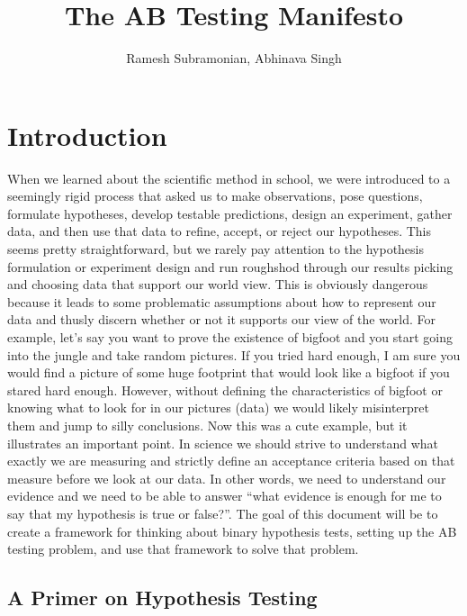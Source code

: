 \documentclass[12pt]{report}
\begin{document}
\title{The AB Testing Manifesto}
\author{Ramesh Subramonian, Abhinava Singh}

\maketitle

\section{Introduction\label{sec:Intro}}

When we learned about the scientific method in school, we were introduced to a seemingly rigid process that 
asked us to make observations, pose questions, formulate hypotheses, develop testable predictions, design an 
experiment, gather data, and then use that data to refine, accept, or reject our hypotheses. This seems pretty 
straightforward, but we rarely pay attention to the hypothesis formulation or experiment design and run 
roughshod through our results picking and choosing data that support our world view. This is obviously 
dangerous because it leads to some problematic assumptions about how to represent our data and thusly discern 
whether or not it supports our view of the world. For example, let’s say you want to prove the existence of 
bigfoot and you start going into the jungle and take random pictures. If you tried hard enough, I am sure you 
would find a picture of some huge footprint that would look like a bigfoot if you stared hard enough. However, 
without defining the characteristics of bigfoot or knowing what to look for in our pictures (data) we would 
likely misinterpret them and jump to silly conclusions. Now this was a cute example, but it illustrates an 
important point. In science we should strive to understand what exactly we are measuring and strictly 
define an acceptance criteria based on that measure before we look at our data. In other words, we need 
to understand our evidence and we need to be able to answer “what evidence is enough for me to say that my 
hypothesis is true or false?”. The goal of this document will be to create a framework for thinking about 
binary hypothesis tests, setting up the AB testing problem, and use that framework to solve that problem.


\subsection{A Primer on Hypothesis Testing}
\end{document}

